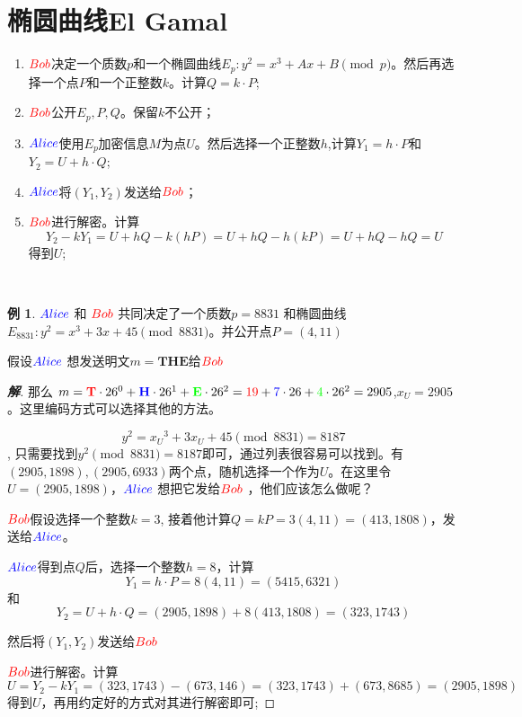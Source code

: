 \documentclass{article}
\theoremstyle{definition}
\newtheorem{example}{\indent 例}
\newenvironment{solution}{\begin{proof}[\indent\bf 解]}{\end{proof}}
\begin{document}
\section{椭圆曲线El Gamal}

\begin{enumerate}
\item ${\color{red}Bob}$决定一个质数$p$和一个椭圆曲线$E_p:y^2 = x^3+Ax+B \pmod{p}$。然后再选择一个点$P$和一个正整数$k$。计算$Q = k\cdot P$;
\item ${\color{red}Bob}$公开$E_p,P,Q$。保留$k$不公开；
\item ${\color{blue}Alice}$使用$E_p$加密信息$M$为点$U$。然后选择一个正整数$h$,计算$Y_1 = h\cdot P$和$Y_2= U+h\cdot Q$;
\item ${\color{blue}Alice}$将$(Y_1,Y_2)$发送给${\color{red}Bob}$；
\item ${\color{red}Bob}$进行解密。计算
$$Y_2 - kY_1 = U+hQ-k(hP)=U+hQ-h(kP)=U+hQ-hQ=U$$
得到$U$;
\end{enumerate}

~\\

\begin{example}
${\color{blue}Alice}$ 和 ${\color{red}Bob}$ 共同决定了一个质数$p = 8831$ 和椭圆曲线$ E_{8831} : y^2 = x^3 +3x+45 \pmod{8831}$。并公开点$P = (4,11)$

假设${\color{blue}Alice}$ 想发送明文$m = \textbf{THE}$给${\color{red}Bob}$

\begin{solution}



那么 $m = {\color{red}\textbf{T}} \cdot 26^0 + {\color{blue}\textbf{H}} \cdot 26^1 +  {\color{green}\textbf{E}} \cdot 26^2 = {\color{red}19} + {\color{blue}7} \cdot 26 + {\color{green}4} \cdot 26^2 = 2905$,$x_U = 2905$。这里编码方式可以选择其他的方法。

$$y^2 = {x_U}^3 +3{x_U}+45 \pmod{8831} = 8187$$, 只需要找到$y^2 \pmod{8831} = 8187 $即可，通过列表很容易可以找到。有$(2905, 1898), (2905, 6933)$两个点，随机选择一个作为$U$。在这里令$U = (2905, 1898)$，${\color{blue}Alice}$ 想把它发给${\color{red}Bob}$ ，他们应该怎么做呢？

${\color{red}Bob}$假设选择一个整数$k=3$, 接着他计算$Q = kP = 3(4,11) = (413,1808)$，发送给${\color{blue}Alice}$。

${\color{blue}Alice}$得到点$Q$后，选择一个整数$h = 8$，计算
$$Y_1 = h\cdot P = 8(4,11) = (5415,6321)$$
和
$$Y_2= U+h\cdot Q = (2905, 1898) + 8(413,1808) = (323,1743)$$

然后将$(Y_1,Y_2)$发送给${\color{red}Bob}$

${\color{red}Bob}$进行解密。计算
$$U = Y_2 - kY_1 = (323,1743) - (673,146) = (323,1743) + (673,8685) =(2905, 1898)$$
得到$U$，再用约定好的方式对其进行解密即可;
\end{solution}
\end{example}
\end{document}
